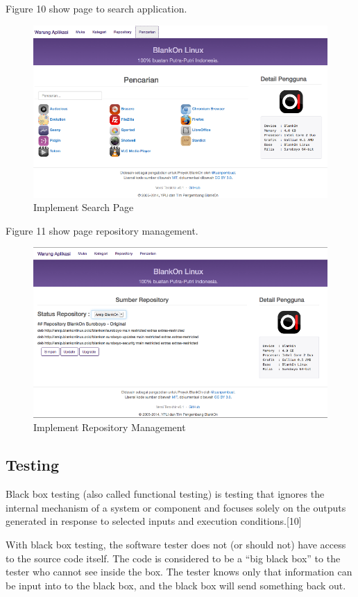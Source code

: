 \documentclass[conference, letterpaper]{IEEEtran}
\begin{document}
Figure 10 show page to search application.
\begin{figure}[!t]
\centering
\includegraphics[scale=0.31]{image/03HamalanPencarian.png}
\caption{Implement Search Page}
\end{figure}

Figure 11 show page repository management.
\begin{figure}[!t]
\centering
\includegraphics[scale=0.31]{image/02HalamanRepository.png}
\caption{Implement Repository Management}
\end{figure}

\subsection{Testing}
Black box testing (also called functional testing) is testing that ignores the internal mechanism of a system or component and focuses solely on the outputs generated in response to selected inputs and execution conditions.[10]

With black box testing, the software tester does not (or should not) have access to the source code itself. The code is considered to be a “big black box” to the tester who cannot see inside the box. The tester knows only that information can be input into to the black box, and the black box will send something back out.
\end{document}
